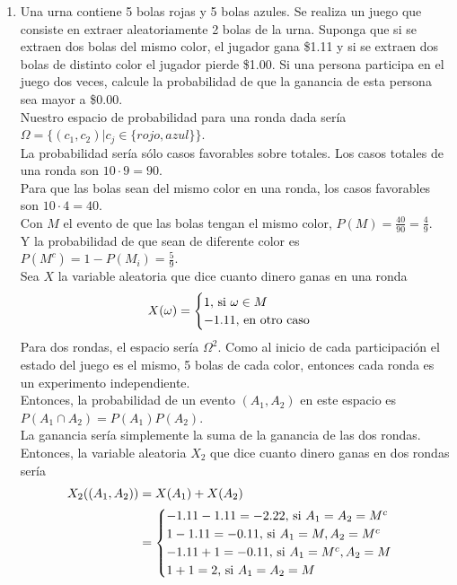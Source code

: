 \documentclass[12pt,a4paper]{report}
\begin{document}
\begin{enumerate}
		\item {
			Una urna contiene 5 bolas rojas y 5 bolas azules. Se realiza un juego
			que consiste en extraer aleatoriamente 2 bolas de la urna. Suponga que
			si se extraen dos bolas del mismo color, el jugador gana \$1.11 y si se
			extraen dos bolas de distinto color el jugador pierde \$1.00. Si una
			persona participa en el juego dos veces, calcule la probabilidad de que
			la ganancia de esta persona sea mayor a \$0.00.\\
			Nuestro espacio de probabilidad para una ronda dada sería
			$\Omega = \{(c_1, c_2)| c_j \in \{rojo, azul\}\}$.\\
			La probabilidad sería sólo casos favorables sobre totales.
			Los casos totales de una ronda son $10 \cdot 9 = 90$.\\
			Para que las bolas sean del mismo color en una ronda,
			los casos favorables son $10 \cdot 4 = 40$.\\
			Con $M$ el evento de que las bolas tengan el mismo color,
			$P(M) = \frac{40}{90} = \frac{4}{9}$.\\
			Y la probabilidad de que sean de diferente color es
			$P(M^c) = 1 - P(M_i) = \frac{5}{9}$.\\
			Sea $X$ la variable aleatoria que dice cuanto dinero ganas en una
			ronda
			\[
				X(\omega) = \begin{cases}
								1, $ si $ \omega \in M\\
								-1.11, $ en otro caso$
							\end{cases}
			\]
			Para dos rondas, el espacio sería $\Omega^2$.
			Como al inicio de cada participación el estado del juego es el mismo,
			5 bolas de cada color, entonces cada ronda es un experimento
			independiente.\\
			Entonces, la probabilidad de un evento $(A_1, A_2)$ en este espacio es
			$P(A_1 \cap A_2) = P(A_1)P(A_2)$.\\
			La ganancia sería simplemente la suma de la ganancia de las dos rondas.\\
			Entonces, la variable aleatoria $X_2$ que dice cuanto dinero ganas
			en dos rondas sería
			\begin{align*}
				X_2((A_1, A_2)) &= X(A_1)+X(A_2)\\
								&= \begin{cases}
									-1.11-1.11 = -2.22, $ si $ A_1 = A_2 = M^c \\
									1-1.11 = -0.11, $ si $ A_1 = M, A_2 = M^c \\
									-1.11+1 = -0.11, $ si $ A_1 = M^c, A_2 = M \\
									1+1 = 2, $ si $ A_1 = A_2 = M \\
								\end{cases}
			\end{align*}

}
\end{enumerate}
\end{document}
